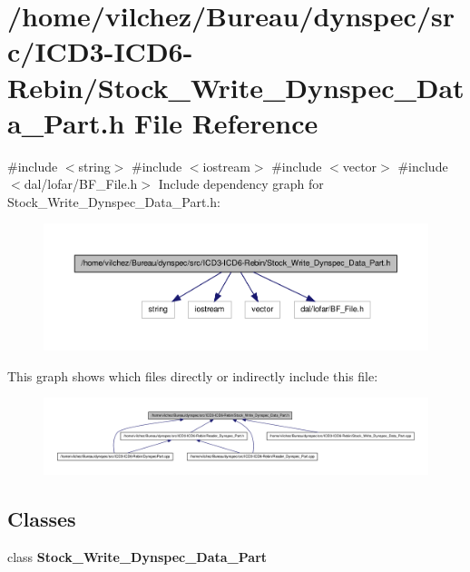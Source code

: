 \section{/home/vilchez/\-Bureau/dynspec/src/\-I\-C\-D3-\/\-I\-C\-D6-\/\-Rebin/\-Stock\-\_\-\-Write\-\_\-\-Dynspec\-\_\-\-Data\-\_\-\-Part.h \-File \-Reference}
\label{_stock___write___dynspec___data___part_8h}
{\ttfamily \#include $<$string$>$}\*
{\ttfamily \#include $<$iostream$>$}\*
{\ttfamily \#include $<$vector$>$}\*
{\ttfamily \#include $<$dal/lofar/\-B\-F\-\_\-\-File.\-h$>$}\*
\-Include dependency graph for \-Stock\-\_\-\-Write\-\_\-\-Dynspec\-\_\-\-Data\-\_\-\-Part.\-h\-:\nopagebreak
\begin{figure}[H]
\begin{center}
\leavevmode
\includegraphics[width=350pt]{_stock___write___dynspec___data___part_8h__incl}
\end{center}
\end{figure}
\-This graph shows which files directly or indirectly include this file\-:\nopagebreak
\begin{figure}[H]
\begin{center}
\leavevmode
\includegraphics[width=350pt]{_stock___write___dynspec___data___part_8h__dep__incl}
\end{center}
\end{figure}
\subsection*{\-Classes}
\begin{DoxyCompactItemize}
\item 
class {\bf \-Stock\-\_\-\-Write\-\_\-\-Dynspec\-\_\-\-Data\-\_\-\-Part}
\end{DoxyCompactItemize}
